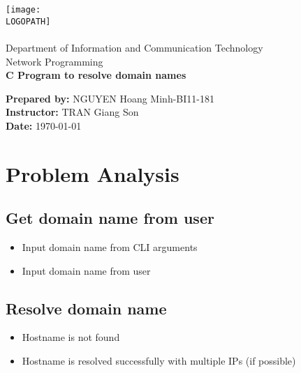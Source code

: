 \documentclass[12pt]{article}
\def \LOGOPATH {assets/logo-usth.png}
\def \DEPARTEMENT {Department of Information and Communication Technology}
\def \COURSENAME {Network Programming}
\def \REPORTTITLE {C Program to resolve domain names}
\def \STUDENTNAME {NGUYEN Hoang Minh}
\def \STUDENTID {BI11-181}
\def \INSTRUCTOR {TRAN Giang Son}
\begin{document}

\begin{titlepage}
    \vfill
    \begin{center}
        \texttt{[image: \\LOGOPATH]} \\
        \hfill \\
        \Large{\DEPARTEMENT} \\
        \Large{\COURSENAME} \\
        \vfill
        \textbf{\LARGE{\REPORTTITLE}}
    \end{center}
    \vfill
    \begin{flushleft}
        \Large{\textbf{Prepared by:} \STUDENTNAME\;-\;\STUDENTID} \\
        \Large{\textbf{Instructor:} \INSTRUCTOR} \\
        \Large{\textbf{Date:} \today}
    \end{flushleft}
    \vfill
\end{titlepage}


\tableofcontents
\clearpage

\setlength{\parskip}{\baselineskip}%



\section{Problem Analysis}

\subsection{Get domain name from user}
\begin{itemize}
    \item Input domain name from CLI arguments
    \item Input domain name from user
\end{itemize}

\subsection{Resolve domain name}
\begin{itemize}
    \item Hostname is not found
    \item Hostname is resolved successfully with multiple IPs (if possible)
\end{itemize}
\end{document}
